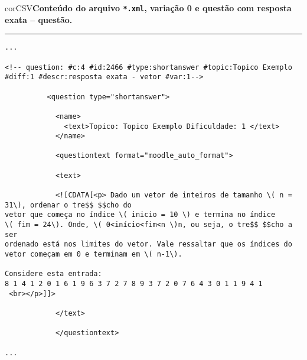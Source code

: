 \begin{myboxCode}{corCSV}{\textbf{Conteúdo do arquivo \texttt{*.xml}, variação 0 e questão com resposta exata -- questão.}}\vspace{3mm}
\hrule
{\scriptsize
\begin{verbatim}
...

<!-- question: #c:4 #id:2466 #type:shortanswer #topic:Topico Exemplo #diff:1 #descr:resposta exata - vetor #var:1-->

          <question type="shortanswer">
          
            <name>
              <text>Topico: Topico Exemplo Dificuldade: 1 </text>
            </name>
            
            <questiontext format="moodle_auto_format">
            
            <text>
            
            <![CDATA[<p> Dado um vetor de inteiros de tamanho \( n = 31\), ordenar o tre$$ $$cho do 
vetor que começa no índice \( inicio = 10 \) e termina no índice 
\( fim = 24\). Onde, \( 0<início<fim<n \)n, ou seja, o tre$$ $$cho a ser
ordenado está nos limites do vetor. Vale ressaltar que os índices do 
vetor começam em 0 e terminam em \( n-1\). 

Considere esta entrada:
8 1 4 1 2 0 1 6 1 9 6 3 7 2 7 8 9 3 7 2 0 7 6 4 3 0 1 1 9 4 1
 <br></p>]]>
 
            </text>
 
            </questiontext>
            
...
\end{verbatim}
}
\end{myboxCode}

